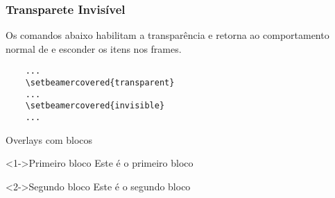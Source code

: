 
\begin{frame}[fragile]
  \frametitle{Transparete Invisível}

  Os comandos abaixo habilitam a transparência e retorna ao comportamento normal de
  e esconder os itens nos frames.

  \begin{verbatim}
    ...
    \setbeamercovered{transparent}
    ...
    \setbeamercovered{invisible}
    ...
  \end{verbatim}

\end{frame}

\begin{frame}{Overlays com blocos}


  \begin{block}<1->{Primeiro bloco}
    Este é o primeiro bloco
  \end{block}
  \vspace{1cm}
  \begin{block}<2->{Segundo bloco}
    Este é o segundo bloco 
  \end{block}

\end{frame}

